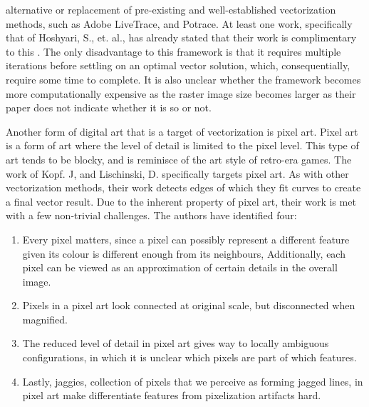 alternative or replacement of pre-existing and well-established vectorization methods, such as Adobe LiveTrace, and Potrace. At least one work, specifically that of Hoshyari, S., et. al., has already stated that their work is complimentary to this \cite{hoshyari2018perceptiondriven}. The only disadvantage to this framework is that it requires multiple iterations before settling on an optimal vector solution, which, consequentially, require some time to complete. It is also unclear whether the framework becomes more computationally expensive as the raster image size becomes larger as their paper does not indicate whether it is so or not.

Another form of digital art that is a target of vectorization is pixel art. Pixel art is a form of art where the level of detail is limited to the pixel level. This type of art tends to be blocky, and is reminisce of the art style of retro-era games. The work of Kopf. J, and Lischinski, D. specifically targets pixel art. As with other vectorization methods, their work detects edges of which they fit curves to create a final vector result. Due to the inherent property of pixel art, their work is met with a few non-trivial challenges. The authors have identified four:

\begin{enumerate}
    \item Every pixel matters, since a pixel can possibly represent a different feature given its colour is different enough from its neighbours, Additionally, each pixel can be viewed as an approximation of certain details in the overall image.

    \item Pixels in a pixel art look connected at original scale, but disconnected when magnified.

    \item The reduced level of detail in pixel art gives way to locally ambiguous configurations, in which it is unclear which pixels are part of which features.

    \item Lastly, jaggies, collection of pixels that we perceive as forming jagged lines, in pixel art make differentiate features from pixelization artifacts hard.
\end{enumerate}

